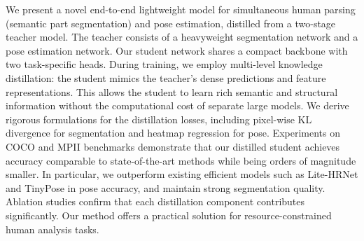 We present a novel end-to-end lightweight model for simultaneous human parsing (semantic part segmentation) and pose estimation, distilled from a two-stage teacher model. The teacher consists of a heavyweight segmentation network and a pose estimation network. Our student network shares a compact backbone with two task-specific heads. During training, we employ multi-level knowledge distillation: the student mimics the teacher’s dense predictions and feature representations. This allows the student to learn rich semantic and structural information without the computational cost of separate large models. We derive rigorous formulations for the distillation losses, including pixel-wise KL divergence for segmentation and heatmap regression for pose. Experiments on COCO and MPII benchmarks demonstrate that our distilled student achieves accuracy comparable to state-of-the-art methods while being orders of magnitude smaller. In particular, we outperform existing efficient models such as Lite-HRNet and TinyPose in pose accuracy, and maintain strong segmentation quality. Ablation studies confirm that each distillation component contributes significantly. Our method offers a practical solution for resource-constrained human analysis tasks.